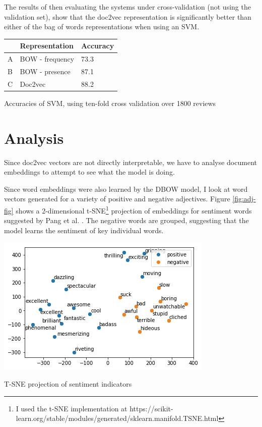 \documentclass[a4paper]{article}
\makeatletter
\newenvironment{tablehere}
    {\def\@captype{table}}
    {}
\newenvironment{figurehere}
    {\def\@captype{figure}}
    {}
\makeatother
\begin{document}
\begin{multicols}{2}
The results of then evaluating the systems under cross-validation (not using the validation set), show that the doc2vec representation is significantly better than either of the bag of words representations when using an SVM.

\begin{tablehere}
    \centering
    \begin{tabular}{|l|l|l|}
    \hline
      & Representation  & Accuracy \\ \hline
    A & BOW - frequency &  73.3    \\ \hline
    B & BOW - presence  &  87.1    \\ \hline
    C & Doc2vec         &  88.2    \\ \hline
    \end{tabular}
    \caption{Accuracies of SVM, using ten-fold cross validation over 1800 reviews}
    \label{tab:acc-table}
\end{tablehere}


\section{Analysis}

Since doc2vec vectors are not directly interpretable, we have to analyse document embeddings to attempt to see what the model is doing.

Since word embeddings were also learned by the DBOW model, I look at word vectors generated for a variety of positive and negative adjectives. Figure \ref{fig:adj-fig} shows a 2-dimensional t-SNE\footnote{I used the t-SNE implementation at https://scikit-learn.org/stable/modules/generated/sklearn.manifold.TSNE.html} projection \cite{maaten2008visualizing} of embeddings for sentiment words suggested by Pang et al. \cite{pang2002thumbs}. The negative words are grouped, suggesting that the model learns the sentiment of key individual words.

\begin{figurehere}
  \centering
  \includegraphics[width=\linewidth,height=\textheight,keepaspectratio]{figs/adjectives.png}
  \caption{T-SNE projection of sentiment indicators}
  \label{fig:adj-fig}
\end{figurehere}



\end{multicols}
\end{document}

